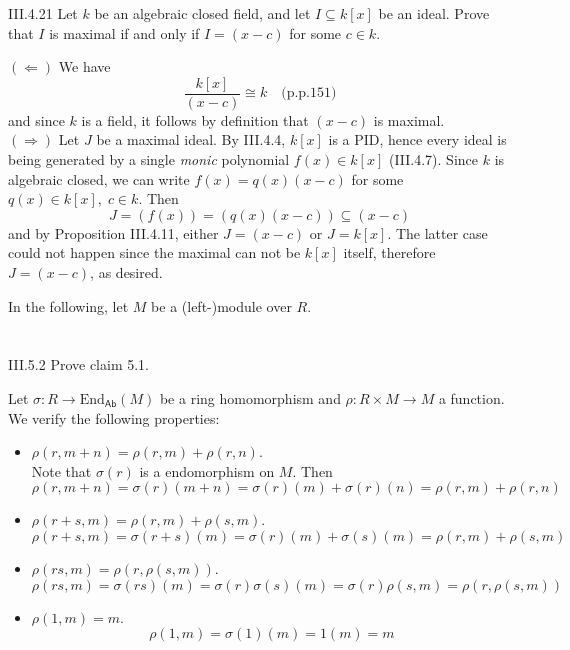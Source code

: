 \begin{problem}{III.4.21}
Let $k$ be an algebraic closed field, and let $I \subseteq k[x]$ be an ideal. Prove that $I$ is maximal if and only if $I = (x-c)$ for some $c \in k$.
\end{problem}
\begin{pf}

\noindent $(\Leftarrow)$ We have 
\[
\frac{k[x]}{(x-c)} \cong k 	\quad \text{(p.p.151)}	
\]
and since $k$ is a field, it follows by definition that $(x-c)$ is maximal. \\
$(\Rightarrow)$ Let $J$ be a maximal ideal. By III.4.4, $k[x]$ is a PID, hence every ideal is being generated by a single \emph{monic} polynomial $f(x) \in k[x]$ (III.4.7). Since $k$ is algebraic closed, we can write $f(x) = q(x)(x-c)$ for some $q(x) \in k[x],\; c \in k$. Then  
\[
J = (f(x)) = (q(x)(x-c)) \subseteq (x-c)
\]
and by Proposition III.4.11, either $J = (x-c)$ or $J = k[x]$. The latter case could not happen since the maximal can not be $k[x]$ itself, therefore $J = (x-c)$, as desired. 
\end{pf}

\el

In the following, let $M$ be a (left-)module over $R$.

\section{}

\begin{problem}{III.5.2}
Prove claim 5.1.
\end{problem}
\begin{pf}
Let $\sigma : R \to \text{End}_\mathsf{Ab}(M)$ be a ring homomorphism and $\rho : R \times M \to M$ a function. We verify the following properties:
\begin{itemize}
\setlength\itemsep{0pt}
\item $\rho(r,m+n) = \rho(r,m) + \rho(r,n)$. \\
Note that $\sigma(r)$ is a endomorphism on $M$. Then 
\[
\rho(r,m+n) = \sigma(r)(m+n) = \sigma(r)(m) + \sigma(r)(n) = \rho(r,m) + \rho(r,n)	
\] 
\item $\rho(r+s, m) = \rho(r,m) + \rho(s,m)$. 
\[
\rho(r+s, m) = \sigma(r+s)(m) = \sigma(r)(m) + \sigma(s)(m) = \rho(r,m) + \rho(s,m)
\]
\item $\rho(rs,m) = \rho(r,\rho(s,m))$. 
\[
\rho(rs,m) = \sigma(rs)(m) = \sigma(r)\sigma(s)(m) = \sigma(r)\rho(s,m) = \rho(r,\rho(s,m))
\]
\item $\rho(1,m) = m$. 
\[
\rho(1,m) = \sigma(1)(m) = 1(m) = m	
\]
\end{itemize}
\end{pf}

